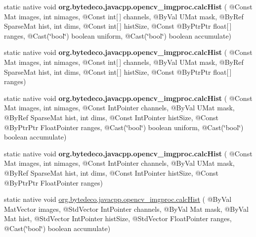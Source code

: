 \begin{DoxyCompactItemize}
\item 
\mbox{\label{group__imgproc__hist_ga8401b27456acdde4fff26e7213ffe7ff}} 
static native void {\bfseries org.\+bytedeco.\+javacpp.\+opencv\+\_\+imgproc.\+calc\+Hist} ( @Const Mat images, int nimages, @Const int\mbox{[}$\,$\mbox{]} channels, @By\+Val U\+Mat mask, @By\+Ref Sparse\+Mat hist, int dims, @Const int\mbox{[}$\,$\mbox{]} hist\+Size, @Const @By\+Ptr\+Ptr float\mbox{[}$\,$\mbox{]} ranges, @Cast(\char`\"{}bool\char`\"{}) boolean uniform, @Cast(\char`\"{}bool\char`\"{}) boolean accumulate)
\item 
\mbox{\label{group__imgproc__hist_ga233d27f68b7a9ce9a73a24a24b997aef}} 
static native void {\bfseries org.\+bytedeco.\+javacpp.\+opencv\+\_\+imgproc.\+calc\+Hist} ( @Const Mat images, int nimages, @Const int\mbox{[}$\,$\mbox{]} channels, @By\+Val U\+Mat mask, @By\+Ref Sparse\+Mat hist, int dims, @Const int\mbox{[}$\,$\mbox{]} hist\+Size, @Const @By\+Ptr\+Ptr float\mbox{[}$\,$\mbox{]} ranges)
\item 
\mbox{\label{group__imgproc__hist_ga57131482263a931d635871aedff63621}} 
static native void {\bfseries org.\+bytedeco.\+javacpp.\+opencv\+\_\+imgproc.\+calc\+Hist} ( @Const Mat images, int nimages, @Const Int\+Pointer channels, @By\+Val U\+Mat mask, @By\+Ref Sparse\+Mat hist, int dims, @Const Int\+Pointer hist\+Size, @Const @By\+Ptr\+Ptr Float\+Pointer ranges, @Cast(\char`\"{}bool\char`\"{}) boolean uniform, @Cast(\char`\"{}bool\char`\"{}) boolean accumulate)
\item 
\mbox{\label{group__imgproc__hist_ga916e74a4d18cf3f357e3a11ea1bbd1a0}} 
static native void {\bfseries org.\+bytedeco.\+javacpp.\+opencv\+\_\+imgproc.\+calc\+Hist} ( @Const Mat images, int nimages, @Const Int\+Pointer channels, @By\+Val U\+Mat mask, @By\+Ref Sparse\+Mat hist, int dims, @Const Int\+Pointer hist\+Size, @Const @By\+Ptr\+Ptr Float\+Pointer ranges)
\item 
static native void \hyperlink{group__imgproc__hist_gaae5adf8a34c06197b68e79d8dcb9c9fd}{org.\+bytedeco.\+javacpp.\+opencv\+\_\+imgproc.\+calc\+Hist} ( @By\+Val Mat\+Vector images, @Std\+Vector Int\+Pointer channels, @By\+Val Mat mask, @By\+Val Mat hist, @Std\+Vector Int\+Pointer hist\+Size, @Std\+Vector Float\+Pointer ranges, @Cast(\char`\"{}bool\char`\"{}) boolean accumulate)

\end{DoxyCompactItemize}
